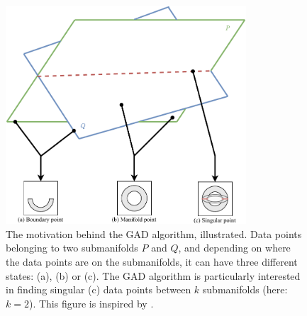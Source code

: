 \begin{figure}[H]
    \centering
    \includegraphics[width=0.8\textwidth]{thesis/figures/geometric-anomaly-detection-motivation_cropped.pdf}
    \caption{The motivation behind the GAD algorithm, illustrated. Data points belonging to two submanifolds $P$ and $Q$, and depending on where the data points are on the submanifolds, it can have three different states: (a), (b) or (c). The GAD algorithm is particularly interested in finding singular (c) data points between $k$ submanifolds (here: $k=2$). This figure is inspired by \cite[Figure 1]{stolz2020geometric}.}
    \label{fig:gad-motivation}
\end{figure}


